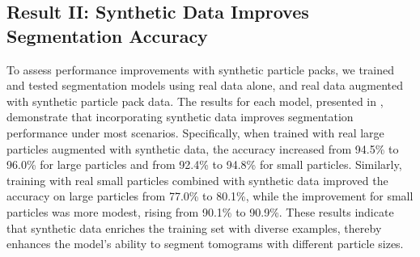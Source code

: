 \documentclass[preprint,12pt]{elsarticle}
\begin{document}
\subsection{Result II: Synthetic Data Improves Segmentation Accuracy}
To assess performance improvements with synthetic particle packs, we trained and tested segmentation models using real data alone, and real data augmented with synthetic particle pack data. 
The results for each model, presented in , demonstrate that incorporating synthetic data improves segmentation performance under most scenarios.
Specifically, when trained with real large particles augmented with synthetic data, the accuracy increased from 94.5\% to 96.0\% for large particles and from 92.4\% to 94.8\% for small particles. 
Similarly, training with real small particles combined with synthetic data improved the accuracy on large particles from 77.0\% to 80.1\%, while the improvement for small particles was more modest, rising from 90.1\% to 90.9\%. 
These results indicate that synthetic data enriches the training set with diverse examples, thereby enhances the model's ability to segment tomograms with different particle sizes. 
\end{document}
